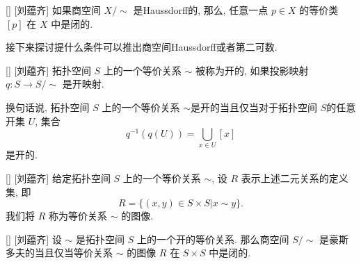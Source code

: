 \documentclass[UTF8]{ctexart}
\begin{document}
        \begin{ppt}
            []
            {}
            []
            [刘蕴齐]
            如果商空间 \(X / \sim\) 是Haussdorff的, 那么, 任意一点 \(p \in X\) 的等价类 \([p]\) 在 \(X\) 中是闭的. 
        \end{ppt}

        \vspace{10pt}
        
        接下来探讨提什么条件可以推出商空间Haussdorff或者第二可数. 

        \begin{dfn}
            []
            {}
            []
            [刘蕴齐]
            拓扑空间 \( S \) 上的一个等价关系 \( \sim \) 被称为开的, 如果投影映射 \( q: S \to S/\sim \) 是开映射. 
        \end{dfn}

        \begin{rmk}
            []
            换句话说, 拓扑空间 \( S \) 上的一个等价关系 \( \sim \)是开的当且仅当对于拓扑空间 \( S \)的任意开集 \(U\), 集合
            \[
                q^{-1}(q(U)) = \bigcup_{x \in U} [x]
            \]
            是开的. 
        \end{rmk}

        \begin{dfn}
            []
            {}
            []
            [刘蕴齐]
            给定拓扑空间 \( S \) 上的一个等价关系 \( \sim \), 设 \(R\) 表示上述二元关系的定义集, 即
            \[
                R = \{(x,y) \in S \times S | x \sim y\}.
            \]
            我们将 \(R\) 称为等价关系 \(\sim\) 的图像. 
        \end{dfn}

        \begin{thm}
            {}
            []
            [刘蕴齐]
            设 \( \sim \) 是拓扑空间 \( S \) 上的一个开的等价关系. 那么商空间 \( S/\sim \) 是豪斯多夫的当且仅当等价关系 \( \sim \) 的图像 \( R \) 在 \( S \times S \) 中是闭的. 
        \end{thm}
\end{document}
